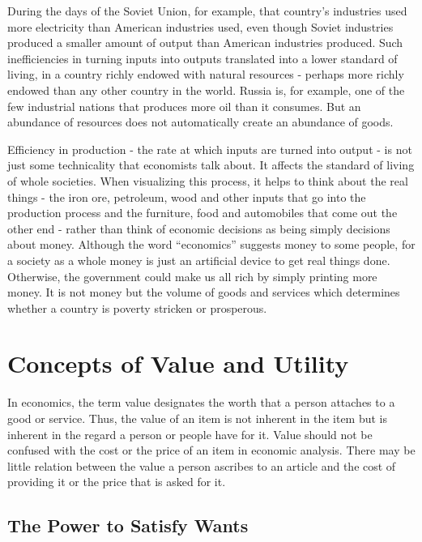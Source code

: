 During the days of the Soviet Union, for example, that country’s industries used more electricity than American industries used, even though Soviet industries produced a smaller amount of output than American industries produced. Such inefficiencies in turning inputs into outputs translated into a lower standard of living, in a country richly endowed with natural resources - perhaps more richly endowed than any other country in the world. Russia is, for example, one of the few industrial nations that produces more oil than it consumes. But an abundance of resources does not automatically create an abundance of goods.

Efficiency in production - the rate at which inputs are turned into output - is not just some technicality that economists talk about. It affects the standard of living of whole societies. When visualizing this process, it helps to think about the real things - the iron ore, petroleum, wood and other inputs that go into the production process and the furniture, food and automobiles that come out the other end - rather than think of economic decisions as being simply decisions about money. Although the word ``economics'' suggests money to some people, for a society as a whole money is just an artificial device to get real things done. Otherwise, the government could make us all rich by simply printing more money. It is not money but the volume of goods and services which determines whether a country is poverty stricken or prosperous.
    

\section{Concepts of Value and Utility}

In economics, the term value designates the worth that a person attaches to a good or service. Thus, the value of an item is not inherent in the item but is inherent in the regard a person or people have for it. Value should not be confused with the cost or the price of an item in economic analysis. There may be little relation between the value a person ascribes to an article and the cost of providing it or the price that is asked for it.

\subsection{The Power to Satisfy Wants}

